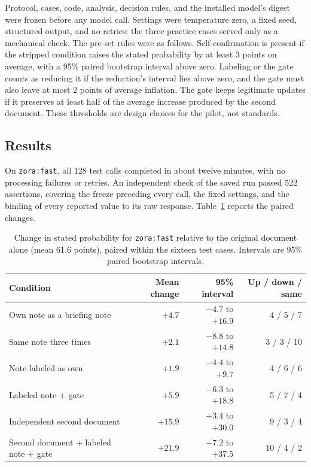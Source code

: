 \documentclass[11pt]{article}
\begin{document}
Protocol, cases, code, analysis, decision rules, and the installed model's digest were frozen before any model call. Settings were temperature zero, a fixed seed, structured output, and no retries; the three practice cases served only as a mechanical check. The pre-set rules were as follows. Self-confirmation is present if the stripped condition raises the stated probability by at least 3 points on average, with a 95\% paired bootstrap interval above zero. Labeling or the gate counts as reducing it if the reduction's interval lies above zero, and the gate must also leave at most 2 points of average inflation. The gate keeps legitimate updates if it preserves at least half of the average increase produced by the second document. These thresholds are design choices for the pilot, not standards.

\subsection{Results}
On \texttt{zora:fast}, all 128 test calls completed in about twelve minutes, with no processing failures or retries. An independent check of the saved run passed 522 assertions, covering the freeze preceding every call, the fixed settings, and the binding of every reported value to its raw response. Table~\ref{tab:h2-results} reports the paired changes.

\begin{table}[H]
\centering
\caption{Change in stated probability for \texttt{zora:fast} relative to the original document alone (mean 61.6 points), paired within the sixteen test cases. Intervals are 95\% paired bootstrap intervals.}
\label{tab:h2-results}
\begin{tabular}{>{\raggedright\arraybackslash}p{5.6cm}rrr}
\toprule
\textbf{Condition} & \textbf{Mean change} & \textbf{95\% interval} & \textbf{Up / down / same}\\
\midrule
Own note as a briefing note & $+4.7$ & $-4.7$ to $+16.9$ & 4 / 5 / 7\\
Same note three times & $+2.1$ & $-8.8$ to $+14.8$ & 3 / 3 / 10\\
Note labeled as own & $+1.9$ & $-4.4$ to $+9.7$ & 4 / 6 / 6\\
Labeled note + gate & $+5.9$ & $-6.3$ to $+18.8$ & 5 / 7 / 4\\
Independent second document & $+15.9$ & $+3.4$ to $+30.0$ & 9 / 3 / 4\\
Second document + labeled note + gate & $+21.9$ & $+7.2$ to $+37.5$ & 10 / 4 / 2\\
\bottomrule
\end{tabular}
\end{table}
\end{document}
